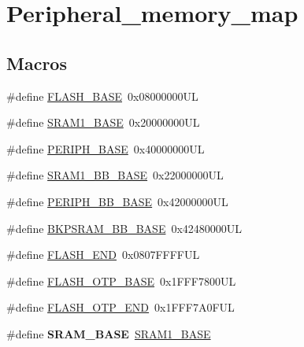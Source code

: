 \hypertarget{group___peripheral__memory__map}{}\section{Peripheral\+\_\+memory\+\_\+map}
\label{group___peripheral__memory__map}
\subsection*{Macros}
\begin{DoxyCompactItemize}
\item 
\#define \hyperlink{group___peripheral__memory__map_ga23a9099a5f8fc9c6e253c0eecb2be8db}{F\+L\+A\+S\+H\+\_\+\+B\+A\+SE}~0x08000000\+UL
\item 
\#define \hyperlink{group___peripheral__memory__map_ga7d0fbfb8894012dbbb96754b95e562cd}{S\+R\+A\+M1\+\_\+\+B\+A\+SE}~0x20000000\+UL
\item 
\#define \hyperlink{group___peripheral__memory__map_ga9171f49478fa86d932f89e78e73b88b0}{P\+E\+R\+I\+P\+H\+\_\+\+B\+A\+SE}~0x40000000\+UL
\item 
\#define \hyperlink{group___peripheral__memory__map_gac4c4f61082e4b168f29d9cf97dc3ca5c}{S\+R\+A\+M1\+\_\+\+B\+B\+\_\+\+B\+A\+SE}~0x22000000\+UL
\item 
\#define \hyperlink{group___peripheral__memory__map_gaed7efc100877000845c236ccdc9e144a}{P\+E\+R\+I\+P\+H\+\_\+\+B\+B\+\_\+\+B\+A\+SE}~0x42000000\+UL
\item 
\#define \hyperlink{group___peripheral__memory__map_gaee19a30c9fa326bb10b547e4eaf4e250}{B\+K\+P\+S\+R\+A\+M\+\_\+\+B\+B\+\_\+\+B\+A\+SE}~0x42480000\+UL
\item 
\#define \hyperlink{group___peripheral__memory__map_ga8be554f354e5aa65370f6db63d4f3ee4}{F\+L\+A\+S\+H\+\_\+\+E\+ND}~0x0807\+F\+F\+F\+F\+UL
\item 
\#define \hyperlink{group___peripheral__memory__map_ga91d296a67aec0da8f31c368cbc0eea94}{F\+L\+A\+S\+H\+\_\+\+O\+T\+P\+\_\+\+B\+A\+SE}~0x1\+F\+F\+F7800\+UL
\item 
\#define \hyperlink{group___peripheral__memory__map_ga5bec9c5a91e312fca36f256f508ceee1}{F\+L\+A\+S\+H\+\_\+\+O\+T\+P\+\_\+\+E\+ND}~0x1\+F\+F\+F7\+A0\+F\+UL
\item 
\mbox{\label{group___peripheral__memory__map_ga05e8f3d2e5868754a7cd88614955aecc}} 
\#define {\bfseries S\+R\+A\+M\+\_\+\+B\+A\+SE}~\hyperlink{group___peripheral__memory__map_ga7d0fbfb8894012dbbb96754b95e562cd}{S\+R\+A\+M1\+\_\+\+B\+A\+SE}

\end{DoxyCompactItemize}
